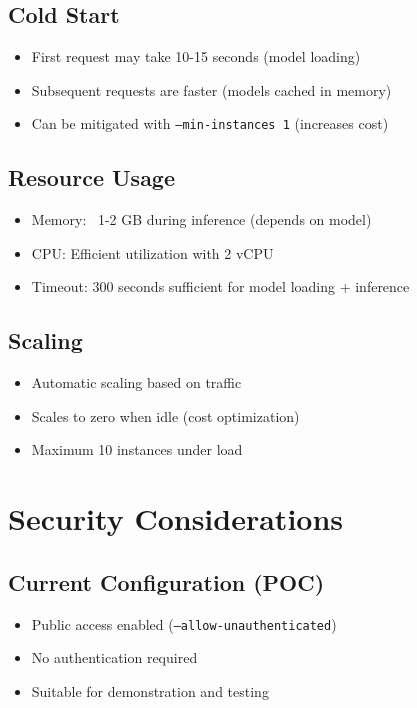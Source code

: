 \documentclass[12pt,a4paper]{article}
\begin{document}
\subsection{Cold Start}
\begin{itemize}
    \item First request may take 10-15 seconds (model loading)
    \item Subsequent requests are faster (models cached in memory)
    \item Can be mitigated with \texttt{--min-instances 1} (increases cost)
\end{itemize}

\subsection{Resource Usage}
\begin{itemize}
    \item Memory: ~1-2 GB during inference (depends on model)
    \item CPU: Efficient utilization with 2 vCPU
    \item Timeout: 300 seconds sufficient for model loading + inference
\end{itemize}

\subsection{Scaling}
\begin{itemize}
    \item Automatic scaling based on traffic
    \item Scales to zero when idle (cost optimization)
    \item Maximum 10 instances under load
\end{itemize}

\section{Security Considerations}

\subsection{Current Configuration (POC)}
\begin{itemize}
    \item Public access enabled (\texttt{--allow-unauthenticated})
    \item No authentication required
    \item Suitable for demonstration and testing
\end{itemize}
\end{document}
